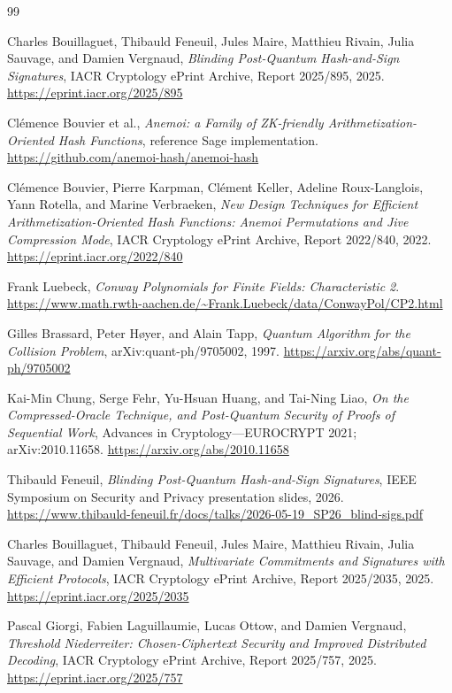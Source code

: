 \documentclass[11pt]{article}
\begin{document}
\begin{thebibliography}{99}

Charles Bouillaguet, Thibauld Feneuil, Jules Maire, Matthieu Rivain,
Julia Sauvage, and Damien Vergnaud,
\emph{Blinding Post-Quantum Hash-and-Sign Signatures},
IACR Cryptology ePrint Archive, Report 2025/895, 2025.
\url{https://eprint.iacr.org/2025/895}

Cl\'emence Bouvier et al.,
\emph{Anemoi: a Family of ZK-friendly Arithmetization-Oriented Hash
Functions}, reference Sage implementation.
\url{https://github.com/anemoi-hash/anemoi-hash}

Cl\'emence Bouvier, Pierre Karpman, Cl\'ement Keller, Adeline Roux-Langlois,
Yann Rotella, and Marine Verbraeken,
\emph{New Design Techniques for Efficient Arithmetization-Oriented Hash
Functions: Anemoi Permutations and Jive Compression Mode},
IACR Cryptology ePrint Archive, Report 2022/840, 2022.
\url{https://eprint.iacr.org/2022/840}

Frank Luebeck,
\emph{Conway Polynomials for Finite Fields: Characteristic 2}.
\url{https://www.math.rwth-aachen.de/~Frank.Luebeck/data/ConwayPol/CP2.html}

Gilles Brassard, Peter H\o yer, and Alain Tapp,
\emph{Quantum Algorithm for the Collision Problem},
arXiv:quant-ph/9705002, 1997.
\url{https://arxiv.org/abs/quant-ph/9705002}

Kai-Min Chung, Serge Fehr, Yu-Hsuan Huang, and Tai-Ning Liao,
\emph{On the Compressed-Oracle Technique, and Post-Quantum Security of Proofs
of Sequential Work},
Advances in Cryptology---EUROCRYPT 2021; arXiv:2010.11658.
\url{https://arxiv.org/abs/2010.11658}

Thibauld Feneuil,
\emph{Blinding Post-Quantum Hash-and-Sign Signatures},
IEEE Symposium on Security and Privacy presentation slides, 2026.
\url{https://www.thibauld-feneuil.fr/docs/talks/2026-05-19_SP26_blind-sigs.pdf}

Charles Bouillaguet, Thibauld Feneuil, Jules Maire, Matthieu Rivain,
Julia Sauvage, and Damien Vergnaud,
\emph{Multivariate Commitments and Signatures with Efficient Protocols},
IACR Cryptology ePrint Archive, Report 2025/2035, 2025.
\url{https://eprint.iacr.org/2025/2035}

Pascal Giorgi, Fabien Laguillaumie, Lucas Ottow, and Damien Vergnaud,
\emph{Threshold Niederreiter: Chosen-Ciphertext Security and Improved
Distributed Decoding},
IACR Cryptology ePrint Archive, Report 2025/757, 2025.
\url{https://eprint.iacr.org/2025/757}


\end{thebibliography}
\end{document}
